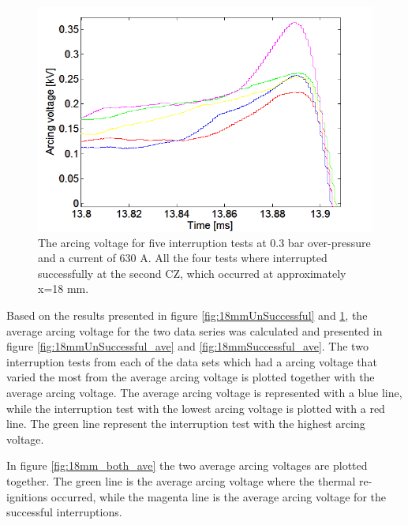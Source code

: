 \documentclass[10pt,b5paper,twoside]{article}
\begin{document}
\begin{figure}[H]
\centering
\includegraphics[scale=0.6, angle =0 ]{Bilder/Results/ArcingVoltage_18_none_reIgnition.PNG}
\caption{The arcing voltage for five interruption tests at 0.3 bar over-pressure and a current of 630 A. All the four tests where interrupted successfully at the second CZ, which occurred at approximately  x=18 mm.} \label{fig:18mmSuccessful}
\end{figure}

Based on the results presented in figure \ref{fig:18mmUnSuccessful} and \ref{fig:18mmSuccessful}, the average arcing voltage for the two data series was calculated and presented in figure \ref{fig:18mmUnSuccessful_ave} and \ref{fig:18mmSuccessful_ave}. The two interruption tests from each of the data sets which had a arcing voltage that varied the most from the average arcing voltage is plotted together with the average arcing voltage. The average arcing voltage is represented with a blue line, while the interruption test with the lowest arcing voltage is plotted with a red line. The green line represent the interruption test with the highest arcing voltage. 

In figure \ref{fig:18mm_both_ave} the two average arcing voltages are plotted together. The green line is the average arcing voltage where the thermal re-ignitions occurred, while the magenta line is the average arcing voltage for the successful interruptions.
\end{document}
